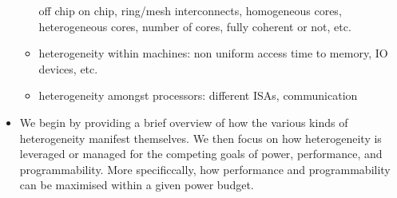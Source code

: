 \begin{itemize}
\begin{itemize}
off chip on chip, ring/mesh interconnects, homogeneous cores, 
heterogeneous cores, number of cores, fully coherent or not, etc.
\item heterogeneity within machines: non uniform access time
to memory, IO devices, etc.
\item heterogeneity amongst processors: different ISAs, communication
\end{itemize}
\item We begin by providing a brief overview of how the various
kinds of heterogeneity manifest themselves. We then
focus on how heterogeneity is leveraged or managed for the
competing goals of power, performance, and programmability.
More specificcally, how performance and programmability can be maximised
within a given power budget.
\end{itemize}



